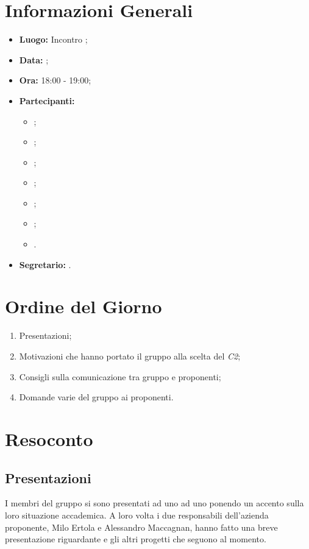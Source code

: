 \section{Informazioni Generali}
\begin{itemize}
\item \textbf{Luogo:} Incontro ;
\item \textbf{Data:} \Data;
\item \textbf{Ora:} 18:00 - 19:00;
\item \textbf{Partecipanti:}
	\begin{itemize}
		\item \BL{}; 
		\item \FF{};
		\item \MM{}; 
		\item \PC{};
		\item \TG{};
		\item \TL{};
		\item \VD{}.
	\end{itemize} 
\item \textbf{Segretario:} \PC{}.
\end{itemize}

\section{Ordine del Giorno}
\begin{enumerate}
	\item Presentazioni;
	\item Motivazioni che hanno portato il gruppo {\Gruppo} alla scelta del  \textit{C2};
	\item Consigli sulla comunicazione tra gruppo e proponenti;
	\item Domande varie del gruppo ai proponenti.
\end{enumerate}

\section{Resoconto}
\subsection{Presentazioni}
I membri del gruppo {\Gruppo} si sono presentati ad uno ad uno ponendo un accento sulla loro situazione accademica. A loro volta i due responsabili dell'azienda proponente, Milo Ertola e Alessandro Maccagnan, hanno fatto una breve presentazione riguardante {\Proponente} e gli altri progetti che seguono al momento.

